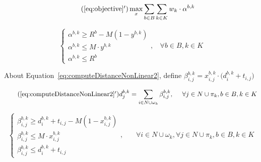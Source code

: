 \documentclass[12pt ]{article}
\begin{document}
\begin{equation} \tag{\ref{eq:objective}$^\prime$}
	\max_x \sum_{b \in B} \sum_{k \in K} w_k \cdot \alpha^{b,k}
	\label{eq:objective_linearization}
\end{equation}

\begin{equation}
	\begin{cases} 
      	\alpha^{b,k} \ge R^b - M ( 1 - y^{b,k} ) \\
      	\alpha^{b,k} \le M \cdot y^{b,k} \\
      	\alpha^{b,k} \le R^b
   	\end{cases}
   	,~~~~\forall b \in B, k \in K
   \label{eq:linearization_alpha}
\end{equation}

\vspace{0.5cm}

About Equation~\ref{eq:computeDistanceNonLinear2}, define $\beta^{b,k}_{i,j} = x^{b,k}_{i,j} \cdot \big(d^{b,k}_{i} + t_{i,j}\big)$

\begin{equation} \tag{\ref{eq:computeDistanceNonLinear2}$^\prime$}
	d_j^{b,k} = \sum_{i \in N \cup \omega_k} \beta^{b,k}_{i,j},~~~~\forall j \in N \cup \pi_k, b \in B, k \in K
	\label{eq:computeDistanceNonLinear2_linearization}
\end{equation}

\begin{equation}
	\begin{cases} 
      	\beta^{b,k}_{i,j} \ge d^{b,k}_{i} + t_{i,j} - M ( 1 - x^{b,k}_{i,j} ) \\
      	\beta^{b,k}_{i,j} \le M \cdot x^{b,k}_{i,j} \\
      	\beta^{b,k}_{i,j} \le d^{b,k}_{i} + t_{i,j}
   	\end{cases}
   	,~~~~~~~~\forall i \in N \cup \omega_k, \forall j \in N \cup \pi_k, b \in B, k \in K
   \label{eq:linearization_beta}
\end{equation}
\end{document}
